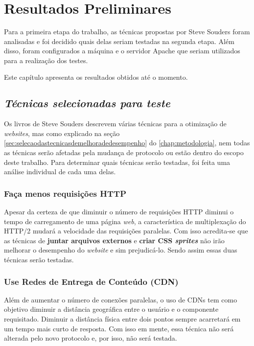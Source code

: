 %
%

\chapter{Resultados Preliminares}
\label{chap:resultados-preliminares}

Para a primeira etapa do trabalho, as técnicas propostas por Steve Souders foram analisadas e foi decidido quais delas seriam testadas na segunda etapa. Além disso, foram configurados a máquina e o servidor Apache que seriam utilizados para a realização dos testes.

Este capítulo apresenta os resultados obtidos até o momento.

\section{\textit{Técnicas selecionadas para teste}}
\label{sec:tecnicasselecionadasparateste}
Os livros de Steve Souders descrevem várias técnicas para a otimização de \textit{websites}, mas como explicado na seção \autoref{sec:selecaodastecnicasdemelhoradedesempenho} do \autoref{chap:metodologia}, nem todas as técnicas serão afetadas pela mudança de protocolo ou estão dentro do escopo deste trabalho. Para determinar quais técnicas serão testadas, foi feita uma análise individual de cada uma delas.

\subsection{Faça menos requisições HTTP}
\label{subsec:preliminares_tec1}
Apesar da certeza de que diminuir o número de requisições HTTP diminui o tempo de carregamento de uma página \textit{web}, a característica de multiplexação do HTTP/2 mudará a velocidade das requisições paralelas. Com isso acredita-se que as técnicas de \textbf{juntar arquivos externos} e \textbf{criar CSS \textit{sprites}} não irão melhorar o desempenho do \textit{website} e sim prejudicá-lo. Sendo assim essas duas técnicas serão testadas. 

\subsection{Use Redes de Entrega de Conteúdo (CDN)}
\label{subsec:preliminares_tec2}
Além de aumentar o número de conexões paralelas, o uso de CDNs tem como objetivo diminuir a distância geográfica entre o usuário e o componente requisitado. Diminuir a distância física entre dois pontos sempre acarretará em um tempo mais curto de resposta. Com isso em mente, essa técnica não será alterada pelo novo protocolo e, por isso, não será testada.

